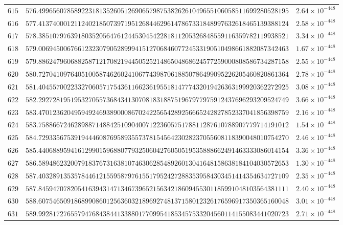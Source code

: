 \documentclass[12pt,reqno]{amsart}
\theoremstyle{remark}
\begin{document}
\begin{longtable}{clc}
$615$ & $576.4996560785892231813526051269065798753826261049655106058511699280528195$ & $2.64\times 10^{-448}$ \\
$616$ & $577.4137400012112402185073971951268446296147867331848997632618465139388124$ & $2.58\times 10^{-448}$ \\
$617$ & $578.3851079763918035205647612445304542281811205326848559116359782119938521$ & $3.34\times 10^{-448}$ \\
$618$ & $579.0069450067661232307905289994151270684607724533190510498661882087342463$ & $1.67\times 10^{-448}$ \\
$619$ & $579.8862479606882587121708219445052521486504868624577259000808586734287158$ & $2.55\times 10^{-448}$ \\
$620$ & $580.7270410976405100587462602410677439870618850786499095226205460820861364$ & $2.78\times 10^{-448}$ \\
$621$ & $581.4045570022332706057175436116623619551814777432019426363199920362272925$ & $3.08\times 10^{-448}$ \\
$622$ & $582.2927281951953270557368434130708183188751967977975912437696293209524749$ & $3.66\times 10^{-448}$ \\
$623$ & $583.4701236204959492469389000867024225654289256665242827852337041856398759$ & $2.16\times 10^{-448}$ \\
$624$ & $583.7588667246289887148842510904007122360575178811287610788907779714191012$ & $1.54\times 10^{-448}$ \\
$625$ & $584.7293356753919444608769589355737815456423028237055608118390048010754270$ & $2.46\times 10^{-448}$ \\
$626$ & $585.4406889594161299015968807793250604276050519535888662491463333086014154$ & $3.36\times 10^{-448}$ \\
$627$ & $586.5894862320079183767316381074630628548926013041648158638184104030572653$ & $1.30\times 10^{-448}$ \\
$628$ & $587.4032891353578446121559587976155179524272883539584303451414354634727109$ & $2.35\times 10^{-448}$ \\
$629$ & $587.8459470782054163943147134673965215634218609455301185991048103564381111$ & $2.40\times 10^{-448}$ \\
$630$ & $588.6075465091868990860125636032189692748137158012326176596917350365160048$ & $3.01\times 10^{-448}$ \\
$631$ & $589.9928172765579476843844133880177099541853457533204560114155083441020723$ & $2.71\times 10^{-448}$ \\

\end{longtable}
\end{document}
